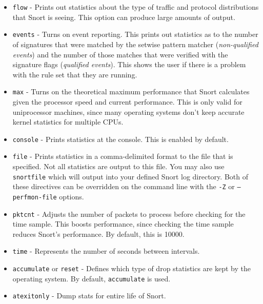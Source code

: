 \documentclass[english]{report}
\begin{document}
\begin{itemize}
\item \texttt{flow} - Prints out statistics about the type
of traffic and protocol distributions that Snort is seeing. This option can
produce large amounts of output.

\item \texttt{events} - Turns on event reporting.  This prints out statistics as
to the number of signatures that were matched by the setwise pattern matcher 
(\textit{non-qualified events}) and the number of those matches that were 
verified with the signature flags (\textit{qualified events}).
This shows the user if there
is a problem with the rule set that they are running.

\item \texttt{max} - Turns on the theoretical maximum performance that Snort
calculates given the processor speed and current performance.  This is only
valid for uniprocessor machines, since many operating systems don't keep
accurate kernel statistics for multiple CPUs.  

\item \texttt{console} - Prints statistics at the console.  This is enabled by default.  

\item \texttt{file} - Prints statistics in a comma-delimited format to the file
that is specified.  Not all statistics are output to this file.  You may
also use \texttt{snortfile} which will output into your defined Snort log
directory.  Both of these directives can be overridden on the command
line with the \texttt{-Z} or \texttt{--perfmon-file} options.

\item \texttt{pktcnt} - Adjusts the number of packets to process before checking for
the time sample.  This boosts performance, since checking the time sample
reduces Snort's performance.  By default, this is 10000.  

\item \texttt{time} - Represents the number of seconds between intervals.

\item \texttt{accumulate} or \texttt{reset} - Defines which type of drop statistics
are kept by the operating system. By default, \texttt{accumulate} is used.

\item \texttt{atexitonly} - Dump stats for entire life of Snort.

\end{itemize}
\end{document}
